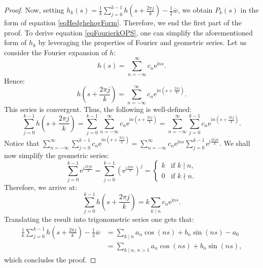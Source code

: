 \documentclass[10pt,a4paper]{amsart}
\newcommand{\e}{\mathrm{e}}
\renewcommand{\i}{\mathrm{i}}
\begin{document}
\begin{proof}
    
    Now, setting $h_k(s) = \frac{1}{k}\sum_{j=0}^{k-1}h\left(s+\frac{2\pi j}{k}\right) - \frac{1}{2}\overline{w}$, we obtain $P_k(s)$ in the form of equation \eqref{eqHedghehogForm}. Therefore, we end the first part of the proof. To derive equation \eqref{eqFourierkOPS}, one can simplify the aforementioned form of $h_k$ by leveraging the properties of Fourier and geometric series. Let us consider the Fourier expansion of $h$:
    $$h(s) = \sum_{n=-\infty}^\infty c_n{\e}^{\i ns}.$$
    Hence:
     $$h\left(s+\frac{2\pi j}{k}\right) = \sum_{n=-\infty}^\infty c_n{\e}^{\i n\left(s+\frac{2\pi j}{k}\right)}.$$
     This series is convergent. Thus, the following is well-defined:
     $$\sum_{j=0}^{k-1}h\left(s+\frac{2\pi j}{k}\right) = \sum_{j=0}^{k-1}\sum_{n=-\infty}^\infty c_n{\e}^{\i n\left(s+\frac{2\pi j}{k}\right)}=\sum_{n=-\infty}^\infty \sum_{j=0}^{k-1} c_n{\e}^{\i n\left(s+\frac{2\pi j}{k}\right)}.$$ Notice that $\sum_{n=-\infty}^\infty \sum_{j=0}^{k-1} c_n{\e}^{\i n\left(s+\frac{2\pi j}{k}\right)} = \sum_{n=-\infty}^\infty c_n{\e}^{\i ns}\sum_{j=0}^{k-1} {\e}^{\i\frac{2\pi jn}{k}}$. We shall now simplify the geometric series:
     $$\sum_{j=0}^{k-1} {\e}^{\i\frac{2\pi jn}{k}} = \sum_{j=0}^{k-1} \left({\e}^{\i\frac{2\pi n}{k}}\right)^j = \begin{cases} 
k & \text{if } k\mid n, \\ 
0 & \text{if } k\nmid n. 
\end{cases}$$ Therefore, we arrive at:
$$\sum_{j=0}^{k-1}h\left(s+\frac{2\pi j}{k}\right) = k\sum_{k\mid n} c_n{\e}^{\i ns}.$$ Translating the result into trigonometric series one gets that:
\begin{align*}
\frac{1}{k}\sum_{j=0}^{k-1}h\left(s+\frac{2\pi j}{k}\right) - \frac{1}{2}\overline{w} &= \sum_{k \mid n} a_n\cos(ns) + b_n\sin(ns) - a_0\\ &= \sum_{k \mid n,\ n > 1}a_n\cos(ns) + b_n\sin(ns),
\end{align*}
which concludes the proof.
    \end{proof}
\end{document}

